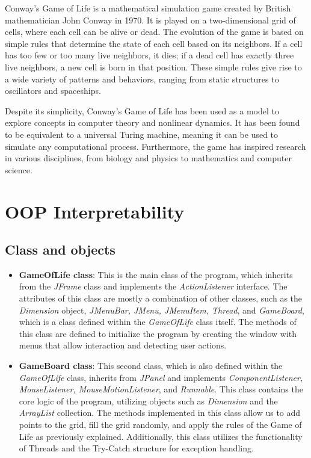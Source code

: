 \documentclass[12pt]{article}
\begin{document}
  Conway's Game of Life is a mathematical simulation game created by British mathematician John Conway in 1970. It is played on a two-dimensional grid of cells, where each cell can be alive or dead. The evolution of the game is based on simple rules that determine the state of each cell based on its neighbors. If a cell has too few or too many live neighbors, it dies; if a dead cell has exactly three live neighbors, a new cell is born in that position. These simple rules give rise to a wide variety of patterns and behaviors, ranging from static structures to oscillators and spaceships.
  

  Despite its simplicity, Conway's Game of Life has been used as a model to explore concepts in computer theory and nonlinear dynamics. It has been found to be equivalent to a universal Turing machine, meaning it can be used to simulate any computational process. Furthermore, the game has inspired research in various disciplines, from biology and physics to mathematics and computer science.

  \section*{OOP Interpretability}
  \subsection*{Class and objects}
  \begin{itemize}
    \item \textbf{GameOfLife class}: This is the main class of the program, which inherits from the \textit{JFrame} class and implements the \textit{ActionListener} interface. The attributes of this class are mostly a combination of other classes, such as the \textit{Dimension} object, \textit{JMenuBar, JMenu, JMenuItem, Thread}, and \textit{GameBoard}, which is a class defined within the \textit{GameOfLife} class itself. The methods of this class are defined to initialize the program by creating the window with menus that allow interaction and detecting user actions.

    \item \textbf{GameBoard class}: This second class, which is also defined within the \textit{GameOfLife} class, inherits from \textit{JPanel} and implements \textit{ComponentListener, MouseListener, MouseMotionListener}, and \textit{Runnable}. This class contains the core logic of the program, utilizing objects such as \textit{Dimension} and the \textit{ArrayList} collection. The methods implemented in this class allow us to add points to the grid, fill the grid randomly, and apply the rules of the Game of Life as previously explained. Additionally, this class utilizes the functionality of Threads and the Try-Catch structure for exception handling.
  \end{itemize}
\end{document}

